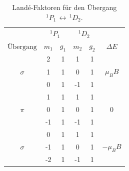 \begin{table}[h]
    \centering
        \caption{Landé-Faktoren für den Übergang $^{1}P_1 \, \leftrightarrow \, ^{1}D_2$.}
        \label{tab:atab00}
        \begin{tabular}{c c c c c c}
            \toprule
            & \multicolumn{2}{c}{$^{1}P_1$} & \multicolumn{2}{c}{$^{1}D_2$} \\ %
            \cmidrule(lr){2-3}\cmidrule(lr){4-5}
            {$\text{Übergang}$} & {$m_1$} & {$g_1$} & {$m_2$} & {$g_2$} & {$\Delta E$} \\
            \midrule
            {}         & 2 & 1 & 1  & 1 & {} \\
            {$\sigma$} & 1 & 1 & 0  & 1 & {$\mu_B B$} \\
            {}         & 0 & 1 & -1 & 1 & {} \\
            \midrule
            {}         & 1  & 1 & 1  & 1 & {} \\
            {$\pi$}    & 0  & 1 & 0  & 1 & 0  \\
            {}         & -1 & 1 & -1 & 1 & {} \\
            \midrule
            {}         & 0  & 1 & 1  & 1 & {} \\
            {$\sigma$} & -1 & 1 & 0  & 1 & {$- \mu_B B$} \\
            {}         & -2 & 1 & -1 & 1 & {} \\
            \bottomrule
        \end{tabular}
\end{table}
\FloatBarrier
